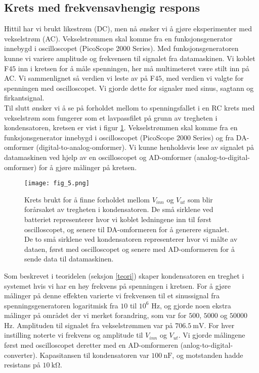 \documentclass[%
 reprint,
 amsmath,amssymb,
 aps,
]{revtex4-1}
\begin{document}
\subsection{Krets med frekvensavhengig respons}
Hittil har vi brukt likestrøm (DC), men nå ønsker vi å gjøre eksperimenter med vekselstrøm (AC). Vekselstrømmen skal komme fra en funksjonsgenerator innebygd i oscilloscopet (PicoScope 2000 Series). Med funksjonsgeneratoren kunne vi variere amplitude og frekvensen til signalet fra datamaskinen. Vi koblet F$45$ inn i kretsen for å måle spenningen, her må multimeteret være stilt inn på AC. Vi sammenlignet så verdien vi leste av på F$45$, med verdien vi valgte for spenningen med oscilloscopet. Vi gjorde dette for signaler med sinus, sagtann og firkantsignal. \\
Til slutt ønsker vi å se på forholdet mellom to spenningsfallet i en RC krets med vekselstrøm som fungerer som et lavpassfilet på grunn av tregheten i kondensatoren, kretsen er vist i figur \ref{fig5}. Vekselstrømmen skal komme fra en funksjonsgenerator innebygd i oscilloscopet (PicoScope 2000 Series) og fra DA-omformer (digital-to-analog-omformer). Vi kunne henholdsvis lese av signalet på datamaskinen ved hjelp av en oscilloscopet og AD-omformer (analog-to-digital-omformer) for å gjøre målinger på kretsen.
\begin{figure}[h!]
  \centering
  \texttt{[image: fig\_5.png]}
  \caption{Krets brukt for å finne forholdet mellom $V_{inn}$ og $V_{ut}$ som blir forårsaket av tregheten i kondensatoren. De små sirklene ved batteriet representerer hvor vi koblet ledningene inn til først oscilloscopet, og senere til DA-omformeren for å generere signalet. De to små sirklene ved kondensatoren representerer hvor vi målte av dataen, først med oscilloscopet og senere med AD-omformeren for å sende data til datamaskinen.}
  \label{fig5}
\end{figure}
Som beskrevet i teoridelen (seksjon \ref{teori}) skaper kondensatoren en treghet i systemet hvis vi har en høy frekvens på spenningen i kretsen. For å gjøre målinger på denne effekten varierte vi frekvensen til et sinussignal fra spenningsgeneratoren logaritmisk fra $10$ til $10^6$ Hz, og gjorde noen ekstra målinger på området der vi merket forandring, som var for $500$, $5000$ og $50000$ Hz. Amplituden til signalet fra vekselstrømmen var på $\SI{706.5}{\milli \volt}$. For hver instilling noterte vi frekvens og amplitude til $V_{inn}$ og $V_{ut}$. Vi gjorde målingene først med oscilloscopet deretter med en AD-omformeren (anlog-to-digital-converter). Kapasitansen til kondensatoren var $\SI{100}{\nano\farad}$, og motstanden hadde resistans på $\SI{10}{\kilo\ohm}$.
\end{document}
